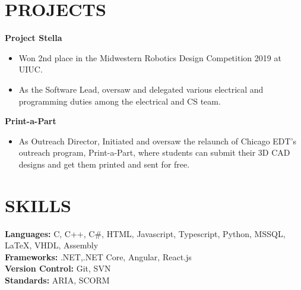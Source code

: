 \documentclass[11pt,letterpaper]{article}
\newcommand{\subheading}[3]{
    \textbf{#1}{ #2 }{\hfill #3 \vspace{-2pt}}
}
\begin{document}
\section{PROJECTS}
\subheading{Project Stella}{}{}
\vspace{-5pt}
\begin{itemize}
  \item Won 2nd place in the Midwestern Robotics Design Competition 2019 at UIUC.
  \item As the Software Lead,  oversaw and delegated various electrical and programming duties among the electrical and CS team.
\end{itemize}
\vspace{-5pt}
\subheading{Print-a-Part}{}{}
\vspace{-5pt}
\begin{itemize}
  \item  As Outreach Director, Initiated and oversaw the relaunch of Chicago EDT's outreach program, Print-a-Part, where students can submit their 3D CAD designs and get them printed and sent for free.
\end{itemize}
\vspace{-10pt}
\begin{comment}
\{}{}{NASA Robot Mining Competition}{-- Team Lunabotics} \\
\vspace{-5pt}
\begin{itemize}
  \item  Initiated and oversaw the conversion of Chicago EDT's  existing assets from Altium Designer to Autodesk EAGLE \\
\end{itemize}
\vspace{-10pt}
\end{comment}
%
\vspace{-5pt}
\section*{SKILLS}
\textbf{Languages:} C, C++, C\#, HTML, Javascript, Typescript, Python, MSSQL, LaTeX, VHDL, Assembly \\
\textbf{Frameworks:} .NET,.NET Core, Angular, React.js \\
\textbf{Version Control:} Git, SVN \\
\textbf{Standards:} ARIA, SCORM \\
\end{document}
